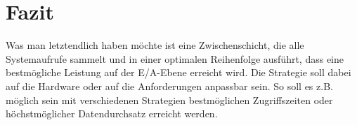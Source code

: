 \section{Fazit}
Was man letztendlich haben möchte ist eine Zwischenschicht, die alle Systemaufrufe sammelt und in einer optimalen Reihenfolge ausführt, dass eine bestmögliche Leistung auf der E/A-Ebene erreicht wird. Die Strategie soll dabei auf die Hardware oder auf die Anforderungen anpassbar sein. So soll es z.B. möglich sein mit verschiedenen Strategien bestmöglichen Zugriffszeiten oder höchstmöglicher Datendurchsatz erreicht werden. 
